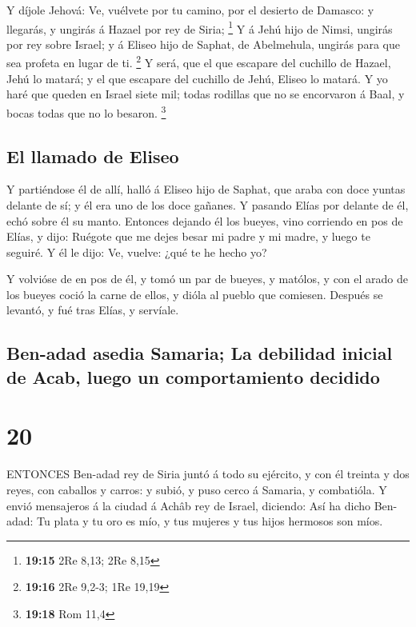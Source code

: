  Y díjole Jehová: Ve, vuélvete por tu camino, por el
desierto de Damasco: y llegarás, y ungirás á Hazael por rey de Siria;
\footnote{\textbf{19:15} 2Re 8,13; 2Re 8,15}  Y á Jehú hijo
de Nimsi, ungirás por rey sobre Israel; y á Eliseo hijo de Saphat, de
Abelmehula, ungirás para que sea profeta en lugar de ti. \footnote{\textbf{19:16}
  2Re 9,2-3; 1Re 19,19}  Y será, que el que escapare del
cuchillo de Hazael, Jehú lo matará; y el que escapare del cuchillo de
Jehú, Eliseo lo matará.  Y yo haré que queden en Israel
siete mil; todas rodillas que no se encorvaron á Baal, y bocas todas que
no lo besaron. \footnote{\textbf{19:18} Rom 11,4}

\hypertarget{el-llamado-de-eliseo}{%
\subsection{El llamado de Eliseo}\label{el-llamado-de-eliseo}}

 Y partiéndose él de allí, halló á Eliseo hijo de Saphat,
que araba con doce yuntas delante de sí; y él era uno de los doce
gañanes. Y pasando Elías por delante de él, echó sobre él su manto.
 Entonces dejando él los bueyes, vino corriendo en pos de
Elías, y dijo: Ruégote que me dejes besar mi padre y mi madre, y luego
te seguiré. Y él le dijo: Ve, vuelve: ¿qué te he hecho yo?

 Y volvióse de en pos de él, y tomó un par de bueyes, y
matólos, y con el arado de los bueyes coció la carne de ellos, y dióla
al pueblo que comiesen. Después se levantó, y fué tras Elías, y
servíale.

\hypertarget{ben-adad-asedia-samaria-la-debilidad-inicial-de-acab-luego-un-comportamiento-decidido}{%
\subsection{Ben-adad asedia Samaria; La debilidad inicial de Acab, luego
un comportamiento
decidido}\label{ben-adad-asedia-samaria-la-debilidad-inicial-de-acab-luego-un-comportamiento-decidido}}

\hypertarget{section-19}{%
\section{20}\label{section-19}}

 ENTONCES Ben-adad rey de Siria juntó á todo su ejército, y
con él treinta y dos reyes, con caballos y carros: y subió, y puso cerco
á Samaria, y combatióla.  Y envió mensajeros á la ciudad á
Achâb rey de Israel, diciendo:  Así ha dicho Ben-adad: Tu
plata y tu oro es mío, y tus mujeres y tus hijos hermosos son míos.

